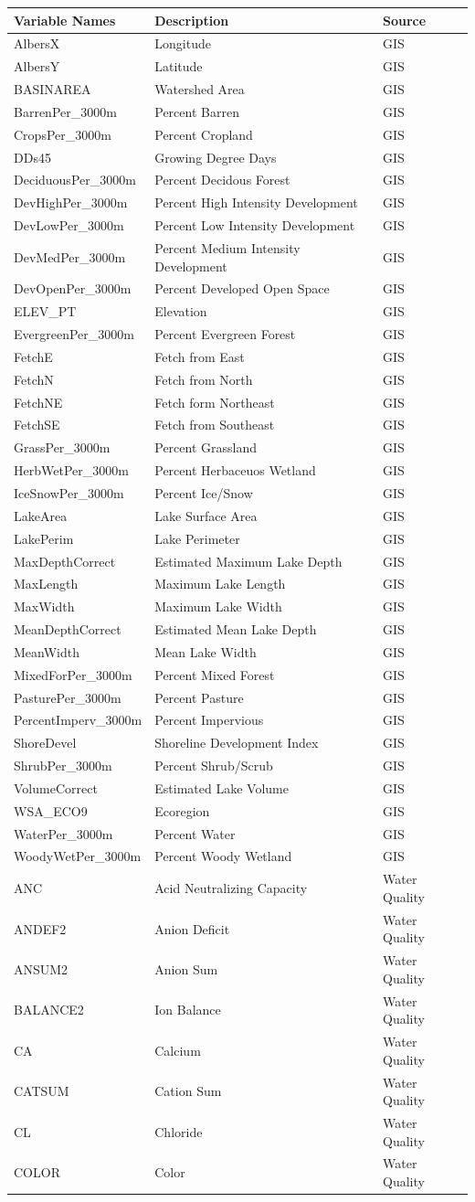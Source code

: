 \documentclass[11pt,]{article}
\begin{document}
\begin{longtable}[c]{@{}lll@{}}
\toprule
Variable Names & Description & Source\tabularnewline
\midrule
\endhead
AlbersX & Longitude & GIS\tabularnewline
AlbersY & Latitude & GIS\tabularnewline
BASINAREA & Watershed Area & GIS\tabularnewline
BarrenPer\_3000m & Percent Barren & GIS\tabularnewline
CropsPer\_3000m & Percent Cropland & GIS\tabularnewline
DDs45 & Growing Degree Days & GIS\tabularnewline
DeciduousPer\_3000m & Percent Decidous Forest & GIS\tabularnewline
DevHighPer\_3000m & Percent High Intensity Development &
GIS\tabularnewline
DevLowPer\_3000m & Percent Low Intensity Development &
GIS\tabularnewline
DevMedPer\_3000m & Percent Medium Intensity Development &
GIS\tabularnewline
DevOpenPer\_3000m & Percent Developed Open Space & GIS\tabularnewline
ELEV\_PT & Elevation & GIS\tabularnewline
EvergreenPer\_3000m & Percent Evergreen Forest & GIS\tabularnewline
FetchE & Fetch from East & GIS\tabularnewline
FetchN & Fetch from North & GIS\tabularnewline
FetchNE & Fetch form Northeast & GIS\tabularnewline
FetchSE & Fetch from Southeast & GIS\tabularnewline
GrassPer\_3000m & Percent Grassland & GIS\tabularnewline
HerbWetPer\_3000m & Percent Herbaceuos Wetland & GIS\tabularnewline
IceSnowPer\_3000m & Percent Ice/Snow & GIS\tabularnewline
LakeArea & Lake Surface Area & GIS\tabularnewline
LakePerim & Lake Perimeter & GIS\tabularnewline
MaxDepthCorrect & Estimated Maximum Lake Depth & GIS\tabularnewline
MaxLength & Maximum Lake Length & GIS\tabularnewline
MaxWidth & Maximum Lake Width & GIS\tabularnewline
MeanDepthCorrect & Estimated Mean Lake Depth & GIS\tabularnewline
MeanWidth & Mean Lake Width & GIS\tabularnewline
MixedForPer\_3000m & Percent Mixed Forest & GIS\tabularnewline
PasturePer\_3000m & Percent Pasture & GIS\tabularnewline
PercentImperv\_3000m & Percent Impervious & GIS\tabularnewline
ShoreDevel & Shoreline Development Index & GIS\tabularnewline
ShrubPer\_3000m & Percent Shrub/Scrub & GIS\tabularnewline
VolumeCorrect & Estimated Lake Volume & GIS\tabularnewline
WSA\_ECO9 & Ecoregion & GIS\tabularnewline
WaterPer\_3000m & Percent Water & GIS\tabularnewline
WoodyWetPer\_3000m & Percent Woody Wetland & GIS\tabularnewline
ANC & Acid Neutralizing Capacity & Water Quality\tabularnewline
ANDEF2 & Anion Deficit & Water Quality\tabularnewline
ANSUM2 & Anion Sum & Water Quality\tabularnewline
BALANCE2 & Ion Balance & Water Quality\tabularnewline
CA & Calcium & Water Quality\tabularnewline
CATSUM & Cation Sum & Water Quality\tabularnewline
CL & Chloride & Water Quality\tabularnewline
COLOR & Color & Water Quality\tabularnewline

\end{longtable}
\end{document}
